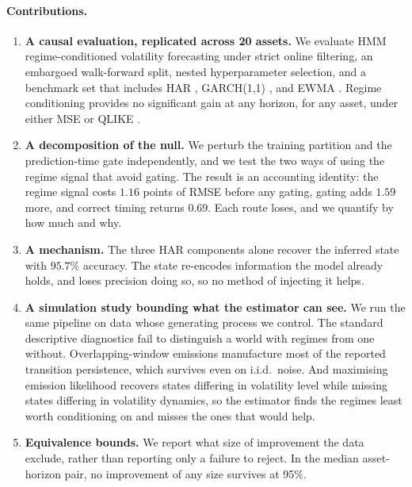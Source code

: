 \documentclass[sigconf,nonacm]{acmart}
\begin{document}
\paragraph{Contributions.}
\begin{enumerate}
  \item \textbf{A causal evaluation, replicated across 20 assets.} We evaluate
    HMM regime-conditioned volatility forecasting under strict online filtering,
    an embargoed walk-forward split, nested hyperparameter selection, and a
    benchmark set that includes HAR \cite{corsi2009}, GARCH(1,1)
    \cite{bollerslev1986}, and EWMA \cite{riskmetrics1996}. Regime conditioning
    provides no significant gain at any horizon, for any asset, under either MSE
    or QLIKE \cite{patton2011}.

  \item \textbf{A decomposition of the null.} We perturb the training partition
    and the prediction-time gate independently, and we test the two ways of using
    the regime signal that avoid gating. The result is an accounting identity: the
    regime signal costs $1.16$ points of RMSE before any gating, gating adds
    $1.59$ more, and correct timing returns $0.69$. Each route loses, and we
    quantify by how much and why.

  \item \textbf{A mechanism.} The three HAR components alone recover the inferred
    state with $95.7\%$ accuracy. The state re-encodes information the model
    already holds, and loses precision doing so, so no method of injecting it
    helps.

  \item \textbf{A simulation study bounding what the estimator can see.} We run
    the same pipeline on data whose generating process we control. The standard
    descriptive diagnostics fail to distinguish a world with regimes from one
    without. Overlapping-window emissions manufacture most of the reported
    transition persistence, which survives even on i.i.d.\ noise. And maximising
    emission likelihood recovers states differing in volatility level while
    missing states differing in volatility dynamics, so the estimator finds the
    regimes least worth conditioning on and misses the ones that would help.

  \item \textbf{Equivalence bounds.} We report what size of improvement the data
    exclude, rather than reporting only a failure to reject. In the median
    asset-horizon pair, no improvement of any size survives at 95\%.


\end{enumerate}
\end{document}
